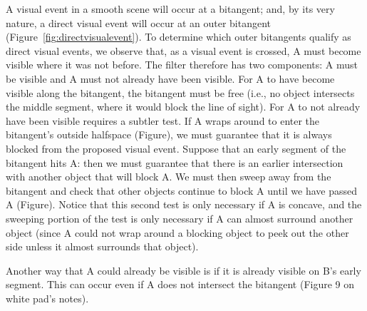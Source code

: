 \documentclass[12pt]{article}
\begin{document}
A visual event in a smooth scene will occur at a bitangent;
and, by its very nature, a direct visual event will occur at an outer bitangent
(Figure~\ref{fig:directvisualevent}).
To determine which outer bitangents qualify as direct visual events,
we observe that, as a visual event is crossed, 
A must become visible where it was not before.
The filter therefore has two components: 
A must be visible and A must not already have been visible.
For A to have become visible along the bitangent, 
the bitangent must be free (i.e., no object intersects
the middle segment, where it would block the line of sight).
For A to not already have been visible requires a subtler test.
If A wraps around to enter the bitangent's outside halfspace (Figure),
we must guarantee that it is always blocked from the proposed visual event.
Suppose that an early segment of the bitangent hits A: then we must guarantee
that there is an earlier intersection with another object that will block A.
We must then sweep away from the bitangent and check that other objects continue
to block A until we have passed A (Figure).
Notice that this second test is only necessary if A is concave, and the sweeping
portion of the test is only necessary if A can almost surround another object
(since A could not wrap around a blocking object to peek out the other side
unless it almost surrounds that object).

Another way that A could already be visible is if it is already visible on B's early
segment.
This can occur even if A does not intersect the bitangent (Figure 9 on white pad's notes).
\end{document}
